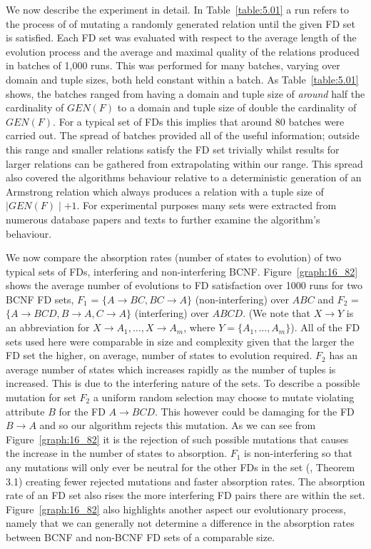 We now describe the experiment in detail. In Table~\ref{table:5.01} a
run refers to the process of  of mutating
a randomly generated relation until the given FD set is satisfied.
 Each FD set was evaluated with respect to the average length of the
 evolution process and the average and maximal quality of the relations
 produced in batches of 1,000 runs.
This was performed for many batches, varying over domain and tuple
sizes, both held constant within a batch. As Table~\ref{table:5.01} 
shows, the batches ranged from having a domain and tuple size
of {\em around} half the cardinality of $GEN(F)$ to
a domain and tuple size of double the cardinality of $GEN(F)$.
  For a typical set of FDs this implies that around 80 batches
 were carried out. The spread of batches provided all of the useful
information; outside this range and smaller relations satisfy the
FD set trivially whilst results for larger relations can be gathered
from extrapolating within our range. This spread also covered the
algorithms behaviour relative to a deterministic generation
of an Armstrong relation which always produces a relation with
a tuple size of $\mid GEN(F) \mid + 1$.
For experimental purposes many sets
were extracted from numerous database papers and texts to further
examine the algorithm's behaviour.

\medskip

We now compare the absorption rates (number of states to
evolution) of two typical sets of FDs, 
interfering and non-interfering BCNF. Figure~\ref{graph:16_82}
shows the average number of evolutions to FD satisfaction over 1000 runs for
two BCNF FD sets, $F_1$ = $\{ A \to BC, BC \to A \}$ (non-interfering)
over $ABC$ and 
$F_2$ = $\{ A \to BCD, B \to A, C \to A \}$ (interfering) over $ABCD$.
 (We note that $X \to Y$ is an abbreviation for $X \to A_1, \ldots, X \to A_m$,
where $Y = \{A_1, \ldots, A_m \}$).
  All of the
FD sets used here were comparable in size and complexity given that the larger
the FD set the higher, on average, number of states to evolution required.
$F_2$ has an average number of states which increases
rapidly as the number of tuples is increased. This is due to the
interfering nature of the sets. To describe a possible mutation
for set $F_2$ a uniform random selection may choose to mutate violating
attribute $B$ for the FD $A \to BCD$. This however could be damaging for
the FD $B \to A$ and so our algorithm rejects this mutation. As we
can see from Figure~\ref{graph:16_82} it is the rejection of such
possible mutations that causes the increase in the number of states
to absorption. $F_1$ is non-interfering so that
any mutations will only ever be neutral for the other FDs in the set 
(\cite{cl96}, Theorem 3.1) creating fewer rejected mutations
and faster absorption rates. The absorption rate of an FD set also
rises the more interfering FD pairs there are within
the set.
Figure~\ref{graph:16_82}  also highlights another
aspect our evolutionary process, namely that we can generally not determine
 a difference in the 
absorption rates between BCNF and non-BCNF FD sets of a comparable
size. \\


